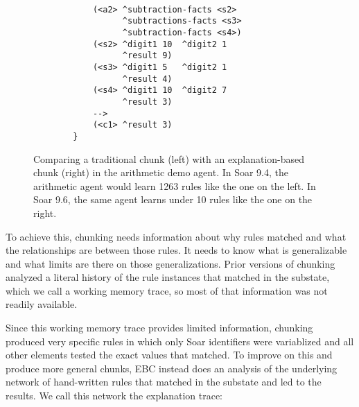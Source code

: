 \begin{figure}
{{\begin{verbatim}
		    
		    (<a2> ^subtraction-facts <s2>
		          ^subtractions-facts <s3>
		          ^subtraction-facts <s4>)
		    (<s2> ^digit1 10  ^digit2 1
		          ^result 9)
		    (<s3> ^digit1 5   ^digit2 1
		          ^result 4)
		    (<s4> ^digit1 10  ^digit2 7
		          ^result 3)
		    -->
		    (<c1> ^result 3)
		}
	\end{verbatim}
	}
	}
	\caption{Comparing a traditional chunk (left) with an explanation-based chunk (right) in the arithmetic demo agent.  In Soar 9.4, the arithmetic agent would learn 1263 rules like the one on the left.  In Soar 9.6, the same agent learns under 10 rules like the one on the right.}
\end{figure}

To achieve this, chunking needs information about why rules matched and what the relationships are between those rules.  It needs to know what is generalizable and what limits are there on those generalizations. Prior versions of chunking analyzed a literal history of the rule instances that matched in the substate, which we call a working memory trace, so most of that information was not readily available.

Since this working memory trace provides limited information, chunking produced very specific rules in which only Soar identifiers were variablized and all other elements tested the exact values that matched.  To improve on this and produce more general chunks, EBC instead does an analysis of the underlying network of hand-written rules that matched in the substate and led to the results.  We call this network the explanation trace:

